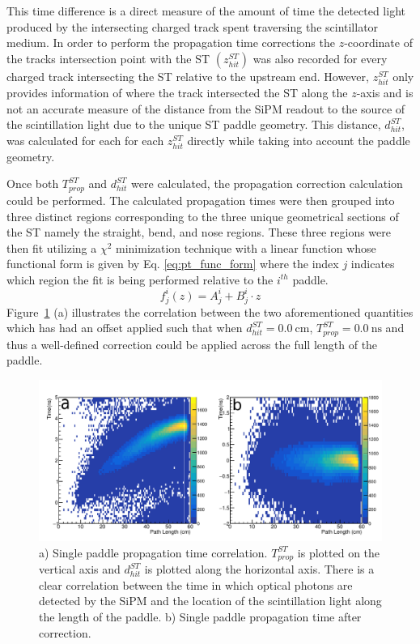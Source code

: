 This time difference is a direct measure of the amount of time the detected light produced by the intersecting charged track spent traversing the scintillator medium.  In order to perform the propagation time corrections the $z$-coordinate of the tracks intersection point with the ST $(z^{ST}_{hit})$ was also recorded for every charged track intersecting the ST relative to the upstream end.  However, $z^{ST}_{hit}$ only provides information of where the track intersected the ST along the $z$-axis and is not an accurate measure of the distance from the SiPM readout to the source of the scintillation light due to the unique ST paddle geometry.  This distance, $d^{ST}_{hit}$, was calculated for each for each $z^{ST}_{hit}$ directly while taking into account the paddle geometry. 

Once both $T^{ST}_{prop}$ and $d^{ST}_{hit}$ were calculated, the propagation correction calculation could be performed.  The calculated propagation times were then grouped into three distinct regions corresponding to the three unique geometrical sections of the ST namely the straight, bend, and nose regions.  These three regions were then fit utilizing a $\chi^{2}$ minimization technique with a linear function whose functional form is given by Eq. \ref{eq:pt_func_form} where the index $j$ indicates which region the fit is being performed relative to the $i^{th}$ paddle.
	\begin{equation} \label{eq:pt_func_form}
	f^{i}_{j}(z) = A^{i}_{j} + B^{i}_{j} \cdot z
	\end{equation}
Figure~\ref{fig:proptimeuncorr} (a) illustrates the correlation between the two aforementioned quantities which has had an offset applied such that when $d^{ST}_{hit} = 0.0\ \mathrm{cm}$, $T^{ST}_{prop} = 0.0\ \mathrm{ns}$ and thus a well-defined correction could be applied across the full length of the paddle.
\begin{figure}[!htb]
	\centering
	\includegraphics[width=1.0\textwidth]{calibration/figs/drawing}
	\caption{a) Single paddle propagation time correlation.  $T^{ST}_{prop}$ is plotted on the vertical axis and $d^{ST}_{hit}$ is plotted along the horizontal axis. There is a clear correlation between the time in which optical photons are detected by the SiPM and the location of the scintillation light along the length of the paddle. b) Single paddle propagation time after correction.}
	\label{fig:proptimeuncorr}
\end{figure}

